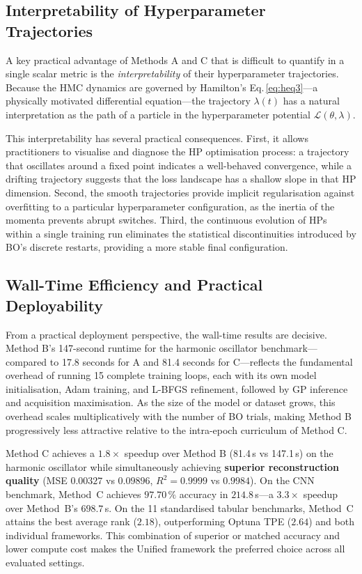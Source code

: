 \documentclass[11pt]{article}
\begin{document}
\subsection{Interpretability of Hyperparameter Trajectories}

A key practical advantage of Methods A and C that is difficult to
quantify in a single scalar metric is the \emph{interpretability} of
their hyperparameter trajectories.  Because the HMC dynamics are
governed by Hamilton's Eq.\,\eqref{eq:heq3}—a physically motivated
differential equation—the trajectory $\lambda(t)$ has a natural
interpretation as the path of a particle in the hyperparameter
potential $\mathcal{L}(\theta, \lambda)$.

This interpretability has several practical consequences.  First, it
allows practitioners to visualise and diagnose the HP optimisation
process: a trajectory that oscillates around a fixed point indicates
a well-behaved convergence, while a drifting trajectory suggests that
the loss landscape has a shallow slope in that HP dimension.  Second,
the smooth trajectories provide implicit regularisation against
overfitting to a particular hyperparameter configuration, as the inertia
of the momenta prevents abrupt switches.  Third, the continuous evolution
of HPs within a single training run eliminates the statistical
discontinuities introduced by BO's discrete restarts, providing a more
stable final configuration.

\subsection{Wall-Time Efficiency and Practical Deployability}

From a practical deployment perspective, the wall-time results are
decisive.  Method B's 147-second runtime for the harmonic oscillator
benchmark---compared to 17.8 seconds for A and 81.4 seconds for C---reflects
the fundamental overhead of running 15 complete training loops, each
with its own model initialisation, Adam training, and L-BFGS refinement,
followed by GP inference and acquisition maximisation.  As the size of
the model or dataset grows, this overhead scales multiplicatively with
the number of BO trials, making Method B progressively less attractive
relative to the intra-epoch curriculum of Method C.

Method C achieves a $1.8\times$ speedup over Method B (81.4\,s vs
147.1\,s) on the harmonic oscillator while simultaneously achieving
\textbf{superior reconstruction quality} (MSE $0.00327$ vs $0.09896$,
$R^2 = 0.9999$ vs $0.9984$).  On the CNN benchmark, Method~C achieves
$97.70\,\%$ accuracy in $214.8$\,s---a $3.3\times$ speedup over
Method~B's $698.7$\,s.  On the 11 standardised tabular benchmarks,
Method~C attains the best average rank ($2.18$), outperforming
Optuna TPE ($2.64$) and both individual frameworks.  This combination
of superior or matched accuracy and lower compute cost makes the Unified
framework the preferred choice across all evaluated settings.
\end{document}
